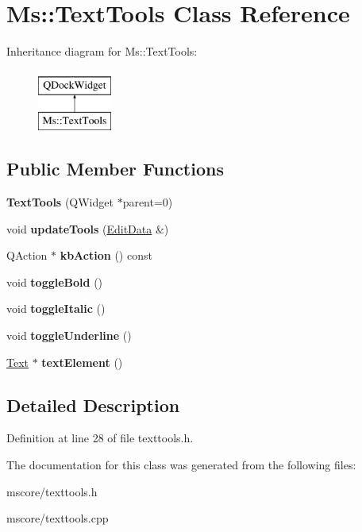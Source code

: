 \hypertarget{class_ms_1_1_text_tools}{}\section{Ms\+:\+:Text\+Tools Class Reference}
\label{class_ms_1_1_text_tools}
Inheritance diagram for Ms\+:\+:Text\+Tools\+:\begin{figure}[H]
\begin{center}
\leavevmode
\includegraphics[height=2.000000cm]{class_ms_1_1_text_tools}
\end{center}
\end{figure}
\subsection*{Public Member Functions}
\begin{DoxyCompactItemize}
\item 
\mbox{\label{class_ms_1_1_text_tools_a0bd0a7068bf47fd2ad706a173c4be89b}} 
{\bfseries Text\+Tools} (Q\+Widget $\ast$parent=0)
\item 
\mbox{\label{class_ms_1_1_text_tools_a281f51523ac3a115d25f220328d91c8a}} 
void {\bfseries update\+Tools} (\hyperlink{class_ms_1_1_edit_data}{Edit\+Data} \&)
\item 
\mbox{\label{class_ms_1_1_text_tools_a12db21c8d9bdaef68bdb727d64dc0eb9}} 
Q\+Action $\ast$ {\bfseries kb\+Action} () const
\item 
\mbox{\label{class_ms_1_1_text_tools_a6996c49c129af2d970eb2e1b1cddc7e4}} 
void {\bfseries toggle\+Bold} ()
\item 
\mbox{\label{class_ms_1_1_text_tools_a2718f2e75c6fa54ba52cf588eaceb5a5}} 
void {\bfseries toggle\+Italic} ()
\item 
\mbox{\label{class_ms_1_1_text_tools_a2ab0a16d99f7bc2b862bee24b0b696bd}} 
void {\bfseries toggle\+Underline} ()
\item 
\mbox{\label{class_ms_1_1_text_tools_a7e497679ba7a84425e5b3117501859e0}} 
\hyperlink{class_ms_1_1_text}{Text} $\ast$ {\bfseries text\+Element} ()
\end{DoxyCompactItemize}


\subsection{Detailed Description}


Definition at line 28 of file texttools.\+h.



The documentation for this class was generated from the following files\+:\begin{DoxyCompactItemize}
\item 
mscore/texttools.\+h\item 
mscore/texttools.\+cpp\end{DoxyCompactItemize}
